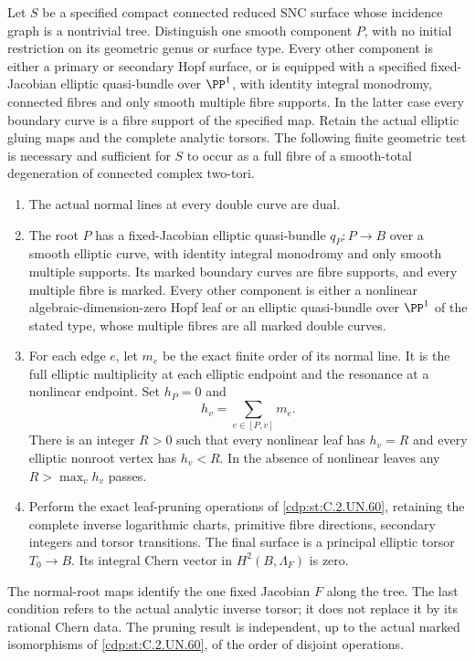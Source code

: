 
\begin{proposition}\label{cdp:st:C.2.UN.61}
Let $S$ be a specified compact connected reduced SNC surface whose
incidence graph is a nontrivial tree. Distinguish one smooth component
$P$, with no initial restriction on its geometric genus or surface
type. Every other component is either a primary or secondary Hopf
surface, or is equipped with a specified fixed-Jacobian elliptic
quasi-bundle over $\PP^1$, with identity integral monodromy,
connected fibres and only smooth multiple fibre supports.
In the latter case every boundary curve is a fibre support of
the specified map. Retain the actual elliptic gluing maps
and the complete analytic torsors. The following finite
geometric test is necessary and sufficient for $S$ to occur
as a full fibre of a smooth-total degeneration of connected complex
two-tori.

\begin{enumerate}
\item The actual normal lines at every double curve are dual.
\item The root $P$ has a fixed-Jacobian elliptic quasi-bundle
$q_P:P\to B$ over a smooth elliptic curve, with identity integral
monodromy and only smooth multiple supports. Its marked boundary
curves are fibre supports, and every multiple fibre is marked.
Every other component is either a nonlinear algebraic-dimension-zero
Hopf leaf or an elliptic quasi-bundle over $\PP^1$ of the stated
type, whose multiple fibres are all marked double curves.
\item For each edge $e$, let $m_e$ be the exact finite order of
its normal line. It is the full elliptic multiplicity at each
elliptic endpoint and the resonance at a nonlinear endpoint.
Set $h_P=0$ and
\[
                  h_v=\sum_{e\in[P,v]}m_e.
                  \tag{C.PT.1}\label{cdp:eq:C.PT.1}
\]
There is an integer $R>0$ such that every nonlinear leaf has
$h_v=R$ and every elliptic nonroot vertex has $h_v<R$.
In the absence of nonlinear leaves any $R>\max_vh_v$ passes.
\item Perform the exact leaf-pruning operations of \ref{cdp:st:C.2.UN.60},
retaining the complete inverse logarithmic charts, primitive fibre
directions, secondary integers and torsor transitions. The final
surface is a principal elliptic torsor $T_0\to B$. Its integral
Chern vector in $H^2(B,\Lambda_F)$ is zero.
\end{enumerate}

The normal-root maps identify the one fixed Jacobian $F$ along
the tree. The last condition refers to the actual analytic
inverse torsor; it does not replace it by its rational Chern
data. The pruning result is independent, up to the actual
marked isomorphisms of \ref{cdp:st:C.2.UN.60}, of the order of disjoint operations.


\end{proposition}
